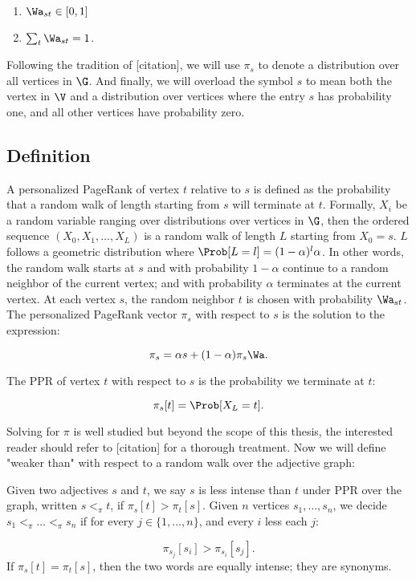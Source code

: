 \begin{enumerate}
	\item $\Wa_{st} \in [0,1]$
	\item $\sum_t \Wa_{st} = 1$.
\end{enumerate}

Following the tradition of [citation], we will use $\pi_s$ to denote a distribution over all vertices in $\G$. And finally, we will overload the symbol $s$ to mean both the vertex in $\V$ and a distribution over vertices where the entry $s$ has probability one, and all other vertices have probability zero. 

\subsection{Definition}

A personalized PageRank of vertex $t$ relative to $s$ is defined as the probability that a random walk of length starting from $s$ will terminate at $t$. Formally, $X_i$ be a random variable ranging over distributions over vertices in $\G$, then the ordered sequence $(X_0, X_1,\ldots,X_L)$ is a random walk of length $L$ starting from $X_0 = s$. $L$ follows a geometric distribution where $\Prob[L = l] = (1 - \alpha)^l \alpha$. In other words, the random walk starts at $s$ and with probability $1 - \alpha$ continue to a random neighbor of the current vertex; and with probability $\alpha$ terminates at the current vertex. At each vertex $s$, the random neighbor $t$ is chosen with probability $\Wa_{st}$. The personalized PageRank vector $\pi_s$ with respect to $s$ is the solution to the expression:

\[
	\pi_s = \alpha s + (1 - \alpha) \pi_s \Wa.
\]

The PPR of vertex $t$ with respect to $s$ is the probability we terminate at $t$:

	\[
		\pi_s[t] = \Prob[X_L = t].
	\]

Solving for $\pi$ is well studied but beyond the scope of this thesis, the interested reader should refer to [citation] for a thorough treatment. Now we will define "weaker than" with respect to a random walk over the adjective graph:

\theoremstyle{definition}
\begin{definition}
Given two adjectives $s$ and $t$, we say $s$ is less intense than $t$ under PPR over the graph, written $s <_{\pi} t$, if $\pi_s[t] > \pi_t[s]$. Given $n$ vertices $s_1, \ldots, s_n$, we decide $s_1 <_{\pi} \ldots <_{\pi} s_n$ if for every $j \in \{1,\ldots,n\}$, and every $i$ less each $j$:

\[
	\pi_{s_j}[s_i] > \pi_{s_i}[s_j].
\]
If $\pi_s[t] = \pi_t[s]$, then the two words are equally intense; they are synonyms.

\end{definition}

